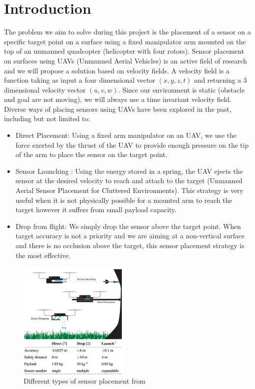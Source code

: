 \section{Introduction}




The problem we aim to solve during this project is the placement of a sensor on a specific target point on a surface using a fixed manipulator arm mounted on the top of an unmanned quadcopter (helicopter with four rotors). 
Sensor placement on surfaces using UAVs (Unmanned Aerial Vehicles) is an active field of research and we will propose a solution based on velocity fields.
A velocity field is a function taking as input  a four dimensional vector $(x,y,z,t)$ and returning a 3 dimensional velocity vector $(u,v,w)$. Since our environment is static (obstacle and goal are not moving), we will always use a time invariant velocity field.
Diverse ways of placing sensors using UAVs have been explored in the past, including but not limited to: 
\begin{itemize}
    \item Direct Placement: Using a fixed arm manipulator on an UAV, we use the force exerted by the thrust of the UAV to provide enough pressure on the tip of the arm to place the sensor on the target point.
    \item Sensor Launching \cite{farinha2020unmanned}: Using the energy stored in a spring, the UAV ejects the sensor at the desired velocity to reach and attach to the target (Unmanned Aerial Sensor Placement for Cluttered Environments). This strategy is very useful when it is not physically possible for a mounted arm to reach the target however it suffers from small payload capacity.
    \item Drop from flight: We simply drop the sensor above the target point. When target accuracy is not a priority and we are aiming at a non-vertical surface and there is no occlusion above the target,  this sensor placement strategy is the most effective. 
\end{itemize}
\begin{figure}[h!]
    \centering
    \includegraphics[width=0.48\textwidth]{Images/threeway.png}
    \caption{Different types of sensor placement from \cite{farinha2020unmanned}}
    \label{fig:threeway}
\end{figure}
